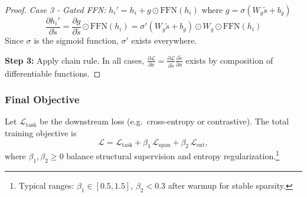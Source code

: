 \begin{proof}
	\textit{Case 3 - Gated FFN:} \(h_i' = h_i + g \odot \mathrm{FFN}(h_i)\) where \(g = \sigma(W_g \tilde{s} + b_g)\)
	\[
	\frac{\partial h_i'}{\partial \tilde{s}} = \frac{\partial g}{\partial \tilde{s}} \odot \mathrm{FFN}(h_i) = \sigma'(W_g \tilde{s} + b_g) \odot W_g \odot \mathrm{FFN}(h_i)
	\]
	Since \(\sigma\) is the sigmoid function, \(\sigma'\) exists everywhere.
	
	\textbf{Step 3:} Apply chain rule.
	In all cases, \(\frac{\partial \mathcal{L}}{\partial x} = \frac{\partial \mathcal{L}}{\partial \tilde{s}} \frac{\partial \tilde{s}}{\partial x}\) exists by composition of differentiable functions.
\end{proof}

\subsubsection{Final Objective}
Let \(\mathcal{L}_{\mathrm{task}}\) be the downstream loss (e.g.\ cross-entropy or contrastive).  The total training objective is
\[
\mathcal{L}
= \mathcal{L}_{\mathrm{task}}
+ \beta_1\,\mathcal{L}_{\mathrm{span}}
+ \beta_2\,\mathcal{L}_{\mathrm{ent}},
\]
where \(\beta_1,\beta_2\ge0\) balance structural supervision and entropy regularization.\footnote{Typical ranges: \(\beta_1\in[0.5,1.5]\), \(\beta_2<0.3\) after warmup for stable sparsity.}

